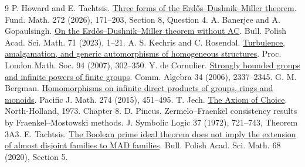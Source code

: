 \documentclass[11pt]{article}
\begin{document}
\begin{thebibliography}{9}
 P. Howard and E. Tachtsis. \href{https://doi.org/10.4064/fm250514-20-7}{Three forms of the Erdős--Dushnik--Miller theorem}. Fund. Math. 272 (2026), 171--203, Section 8, Question 4.
 A. Banerjee and A. Gopaulsingh. \href{https://doi.org/10.4064/ba221221-6-6}{On the Erdős--Dushnik--Miller theorem without AC}. Bull. Polish Acad. Sci. Math. 71 (2023), 1--21.
 A. S. Kechris and C. Rosendal. \href{https://doi.org/10.1112/plms/pdl007}{Turbulence, amalgamation, and generic automorphisms of homogeneous structures}. Proc. London Math. Soc. 94 (2007), 302--350.
 Y. de Cornulier. \href{https://doi.org/10.1080/00927870600550194}{Strongly bounded groups and infinite powers of finite groups}. Comm. Algebra 34 (2006), 2337--2345.
 G. M. Bergman. \href{https://arxiv.org/abs/1406.1932}{Homomorphisms on infinite direct products of groups, rings and monoids}. Pacific J. Math. 274 (2015), 451--495.
 T. Jech. \href{https://gwern.net/doc/math/1973-jech-theaxiomofchoice.pdf}{The Axiom of Choice}. North-Holland, 1973. Chapter 8.
 D. Pincus. Zermelo--Fraenkel consistency results by Fraenkel--Mostowski methods. J. Symbolic Logic 37 (1972), 721--743, Theorem 3A3.
 E. Tachtsis. \href{https://doi.org/10.4064/ba201014-22-1}{The Boolean prime ideal theorem does not imply the extension of almost disjoint families to MAD families}. Bull. Polish Acad. Sci. Math. 68 (2020), Section 5.
\end{thebibliography}
\end{document}
